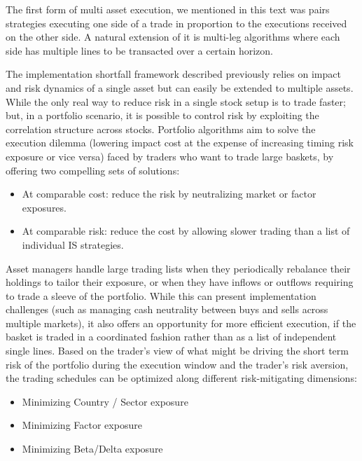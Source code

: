 The first form of multi asset execution, we mentioned in this text was pairs strategies executing one side of a trade in proportion to the executions received on the other side. A natural extension of it is multi-leg algorithms where each side has multiple lines to be transacted over a certain horizon.


The implementation shortfall framework described previously relies on impact and risk dynamics of a single asset but can easily be extended to multiple assets. While the only real way to reduce risk in a single stock setup is to trade faster; but, in a portfolio scenario, it is possible to control risk by exploiting the correlation structure across stocks. Portfolio algorithms aim to solve the execution dilemma (lowering impact cost at the expense of increasing timing risk exposure or vice versa) faced by traders who want to trade large baskets, by offering two compelling sets of solutions:

        \begin{itemize}
        \item At comparable cost: reduce the risk by neutralizing market or factor exposures. 
        \item At comparable risk: reduce the cost by allowing slower trading than a list of individual IS strategies.
        \end{itemize}


Asset managers handle large trading lists when they periodically rebalance their holdings to tailor their exposure, or when they have inflows or outflows requiring to trade a sleeve of the portfolio. While this can present implementation challenges (such as managing cash neutrality between buys and sells across multiple markets), it also offers an opportunity for more efficient execution, if the basket is traded in a coordinated fashion rather than as a list of independent single lines. Based on the trader's view of what might be driving the short term risk of the portfolio during the execution window and the trader's risk aversion, the trading schedules can be optimized along different risk-mitigating dimensions:

        \begin{itemize}
        \item Minimizing Country / Sector exposure
        \item Minimizing Factor exposure
        \item Minimizing Beta/Delta exposure
        \end{itemize}

